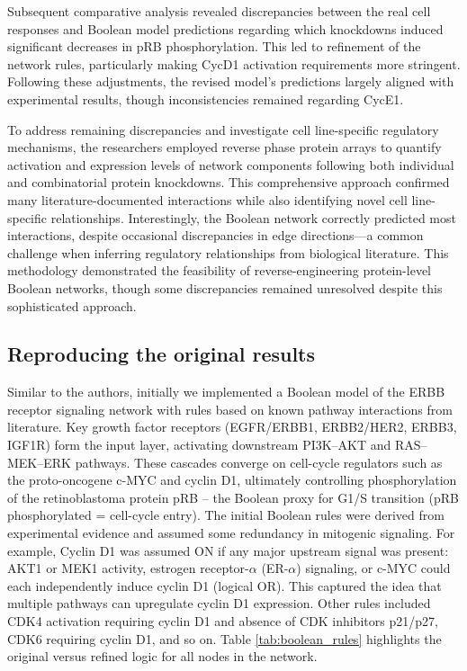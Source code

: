 \documentclass[a4paper,12pt]{article}
\begin{document}
Subsequent comparative analysis revealed discrepancies between the real cell responses and Boolean model predictions regarding which knockdowns induced significant decreases in pRB phosphorylation. This led to refinement of the network rules, particularly making CycD1 activation requirements more stringent. Following these adjustments, the revised model's predictions largely aligned with experimental results, though inconsistencies remained regarding CycE1.

To address remaining discrepancies and investigate cell line-specific regulatory mechanisms, the researchers employed reverse phase protein arrays to quantify activation and expression levels of network components following both individual and combinatorial protein knockdowns. This comprehensive approach confirmed many literature-documented interactions while also identifying novel cell line-specific relationships. Interestingly, the Boolean network correctly predicted most interactions, despite occasional discrepancies in edge directions—a common challenge when inferring regulatory relationships from biological literature. This methodology demonstrated the feasibility of reverse-engineering protein-level Boolean networks, though some discrepancies remained unresolved despite this sophisticated approach.

\subsection{Reproducing the original results}

Similar to the authors, initially we implemented a Boolean model of the ERBB receptor signaling network with rules based on known pathway interactions from literature. Key growth factor receptors (EGFR/ERBB1, ERBB2/HER2, ERBB3, IGF1R) form the input layer, activating downstream PI3K--AKT and RAS--MEK--ERK pathways. These cascades converge on cell-cycle regulators such as the proto-oncogene c-MYC and cyclin D1, ultimately controlling phosphorylation of the retinoblastoma protein pRB -- the Boolean proxy for G1/S transition (pRB phosphorylated = cell-cycle entry). The initial Boolean rules were derived from experimental evidence and assumed some redundancy in mitogenic signaling. For example, Cyclin D1 was assumed ON if any major upstream signal was present: AKT1 or MEK1 activity, estrogen receptor-$\alpha$ (ER-$\alpha$) signaling, or c-MYC could each independently induce cyclin D1 (logical OR). This captured the idea that multiple pathways can upregulate cyclin D1 expression. Other rules included CDK4 activation requiring cyclin D1 and absence of CDK inhibitors p21/p27, CDK6 requiring cyclin D1, and so on. Table \ref{tab:boolean_rules} highlights the original versus refined logic for all nodes in the network.
\end{document}
